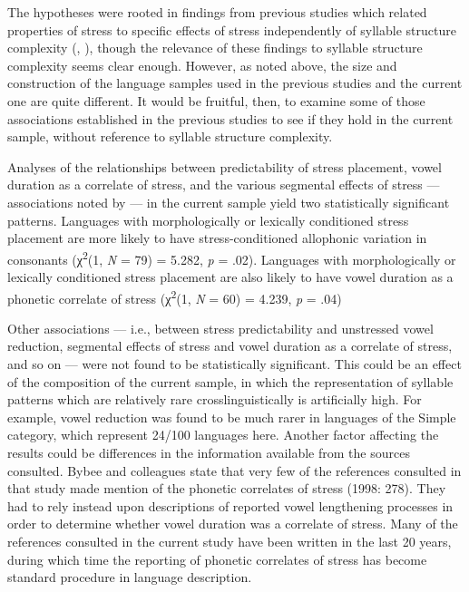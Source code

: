   The hypotheses were rooted in findings from previous studies which related properties of stress to specific effects of stress independently of syllable structure complexity (\citealt{BybeeEtAl1998}, \citealt{Schiering2007}), though the relevance of these findings to syllable structure complexity seems clear enough. However, as noted above, the size and construction of the language samples used in the previous studies and the current one are quite different. It would be fruitful, then, to examine some of those associations established in the previous studies to see if they hold in the current sample, without reference to syllable structure complexity.



  Analyses of the relationships between predictability of stress placement, vowel duration as a correlate of stress, and the various segmental effects of stress — associations noted by \citet{BybeeEtAl1998} — in the current sample yield two statistically significant patterns. Languages with morphologically or lexically conditioned stress placement are more likely to have stress-conditioned allophonic variation in consonants (χ\textsuperscript{2}(1, \textit{N} = 79) = 5.282, \textit{p} = .02). Languages with morphologically or lexically conditioned stress placement are also likely to have vowel duration as a phonetic correlate of stress (χ\textsuperscript{2}(1, \textit{N} = 60) = 4.239, \textit{p} = .04)



  Other associations — i.e., between stress predictability and unstressed vowel reduction, segmental effects of stress and vowel duration as a correlate of stress, and so on — were not found to be statistically significant. This could be an effect of the composition of the current sample, in which the representation of syllable patterns which are relatively rare crosslinguistically is artificially high. For example, vowel reduction was found to be much rarer in languages of the Simple category, which represent 24/100 languages here. Another factor affecting the results could be differences in the information available from the sources consulted. Bybee and colleagues state that very few of the references consulted in that study made mention of the phonetic correlates of stress (1998: 278). They had to rely instead upon descriptions of reported vowel lengthening processes in order to determine whether vowel duration was a correlate of stress. Many of the references consulted in the current study have been written in the last 20 years, during which time the reporting of phonetic correlates of stress has become standard procedure in language description.



